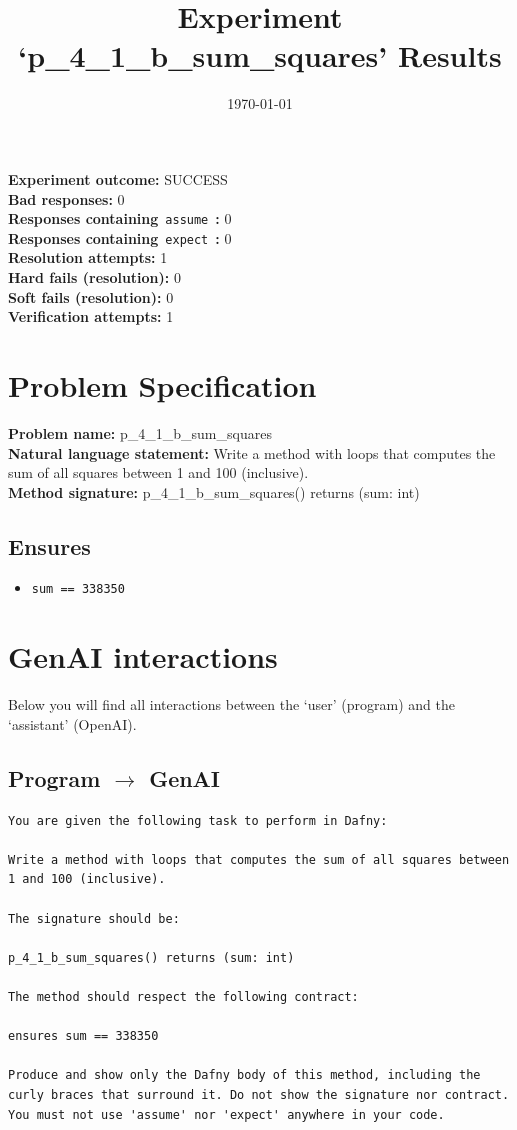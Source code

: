 \documentclass{article}
\begin{document}
\title{Experiment `p\_4\_1\_b\_sum\_squares' Results}
\author{\today}
\date{}
\maketitle
\textbf{Experiment outcome: }SUCCESS
\\\textbf{Bad responses: }0
\\\textbf{Responses containing}~\texttt{assume}~\textbf{: }0
\\\textbf{Responses containing}~\texttt{expect}~\textbf{: }0
\\\textbf{Resolution attempts: }1
\\\textbf{Hard fails (resolution): }0
\\\textbf{Soft fails (resolution): }0
\\\textbf{Verification attempts: }1
\section*{Problem Specification}
\textbf{Problem name: }p\_4\_1\_b\_sum\_squares
\\\textbf{Natural language statement: }Write a method with loops that computes the sum of all squares between 1 and 100 (inclusive).
\\\textbf{Method signature: }p\_4\_1\_b\_sum\_squares() returns (sum: int)
\subsection*{Ensures}
\begin{itemize}
\item \texttt{sum == 338350}
\end{itemize}
\clearpage
\section*{GenAI interactions}
Below you will find all interactions between the `user' (program) and the `assistant' (OpenAI).
\subsection*{Program $\rightarrow$ GenAI}
\begin{lstlisting}
You are given the following task to perform in Dafny:

Write a method with loops that computes the sum of all squares between 1 and 100 (inclusive).

The signature should be:

p_4_1_b_sum_squares() returns (sum: int)

The method should respect the following contract:

ensures sum == 338350

Produce and show only the Dafny body of this method, including the curly braces that surround it. Do not show the signature nor contract. You must not use 'assume' nor 'expect' anywhere in your code.
\end{lstlisting}
\end{document}
